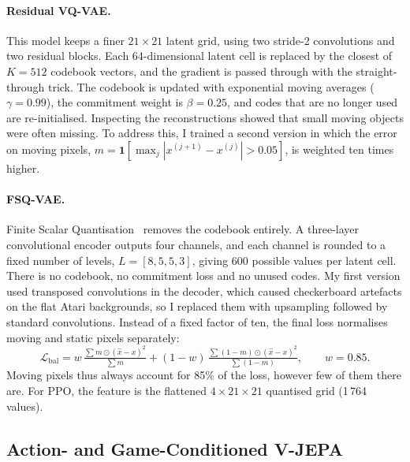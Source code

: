 \documentclass[runningheads]{llncs}
\begin{document}
\paragraph{Residual VQ-VAE.} This model keeps a finer $21\times21$ latent grid, using two
stride-2 convolutions and two residual blocks. Each 64-dimensional latent cell is replaced by
the closest of $K=512$ codebook vectors, and the gradient is passed through with the
straight-through trick. The codebook is updated with exponential moving averages
($\gamma=0.99$), the commitment weight is $\beta=0.25$, and codes that are no longer used are
re-initialised. Inspecting the reconstructions showed that small moving objects were often
missing. To address this, I trained a second version in which the error on moving pixels,
$m=\mathbf{1}[\max_j|x^{(j+1)}-x^{(j)}|>0.05]$, is weighted ten times higher.

\paragraph{FSQ-VAE.} Finite Scalar Quantisation~\cite{mentzer2024fsq} removes the codebook
entirely. A three-layer convolutional encoder outputs four channels, and each channel is
rounded to a fixed number of levels, $L=[8,5,5,3]$, giving 600 possible values per latent cell.
There is no codebook, no commitment loss and no unused codes. My first version
used transposed convolutions in the decoder, which caused checkerboard artefacts on the flat
Atari backgrounds, so I replaced them with upsampling followed by standard convolutions.
Instead of a fixed factor of ten, the final loss normalises moving and static pixels
separately:
\begin{equation}
  \mathcal{L}_{\text{bal}} = w\,\tfrac{\sum m\odot(\hat x-x)^2}{\sum m}
  +(1-w)\,\tfrac{\sum (1-m)\odot(\hat x-x)^2}{\sum (1-m)},\qquad w=0.85.
\end{equation}
Moving pixels thus always account for 85\% of the loss, however few of them there are.
For PPO, the feature is the flattened $4\times21\times21$ quantised grid (1\,764 values).

\FloatBarrier
\subsection{Action- and Game-Conditioned V-JEPA}
\end{document}

